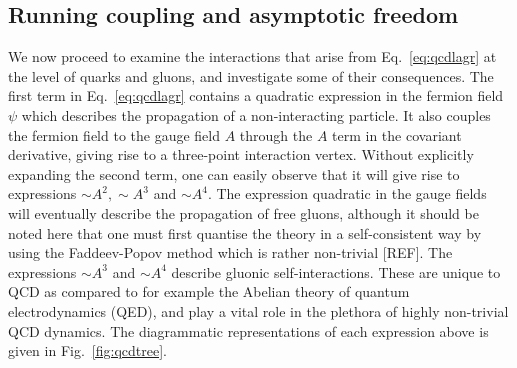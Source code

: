 \documentclass[12pt, a4paper, twoside]{book}
\begin{document}
\subsection{Running coupling and asymptotic freedom}
We now proceed to examine the interactions that arise from Eq.~\eqref{eq:qcdlagr} at the level of quarks and gluons, and investigate some of their consequences. The first term in Eq.~\eqref{eq:qcdlagr} contains a quadratic expression in the fermion field \(\psi\) which describes the propagation of a non-interacting particle. It also couples the fermion field to the gauge field \(A\) through the \(A\) term in the covariant derivative, giving rise to a three-point interaction vertex. Without explicitly expanding the second term, one can easily observe that it will give rise to expressions \(\sim\!A^2, \sim\!A^3\) and \(\sim\!A^4\). The expression quadratic in the gauge fields will eventually describe the propagation of free gluons, although it should be noted here that one must first quantise the theory in a self-consistent way by using the Faddeev-Popov method which is rather non-trivial [REF]. The expressions \(\sim\!A^3\) and \(\sim\!A^4\) describe gluonic self-interactions. These are unique to QCD as compared to for example the Abelian theory of quantum electrodynamics (QED), and play a vital role in the plethora of highly non-trivial QCD dynamics. The diagrammatic representations of each expression above is given in Fig.~\ref{fig:qcdtree}. 
\end{document}

